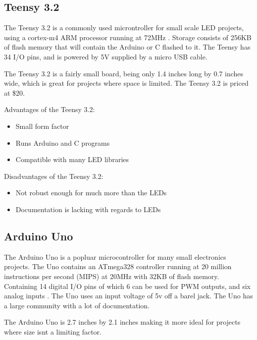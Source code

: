 \documentclass[onecolumn, draftclsnofoot,10pt, compsoc]{IEEEtran}
\begin{document}
		\subsection{Teensy 3.2}
		The Teensy 3.2 is a commonly used microntroller for small scale LED projects,
		using a cortex-m4 ARM processor running at 72MHz \cite[Pg 7]{K20}. Storage consists
		of 256KB of flash memory that will contain the Arduino or C flashed to it.
		The Teensy has 34 I/O pins, and is powered by 5V supplied by a micro USB
		cable.

		\vspace{5mm}
		\noindent The Teensy 3.2 is a fairly small board, being only 1.4 inches long
		by 0.7 inches wide, which is great for projects where space is limited. The
		Teensy 3.2 is priced at \$20.

		\vspace{5mm}
		\noindent Advantages of the Teensy 3.2:
		\begin{itemize}
			\item Small form factor
			\item Runs Arduino and C programs
			\item Compatible with many LED libraries
		\end{itemize}
		Disadvantages of the Teensy 3.2:
		\begin{itemize}
			\item Not robust enough for much more than the LEDs
			\item Documentation is lacking with regards to LEDs
		\end{itemize}
		\subsection{Arduino Uno}

		\vspace{5mm}
		\noindent The Arduino Uno is a popluar microcontroller for many small electronics
		projects. The Uno contains an ATmega328 controller running at 20 million
		instructions per second (MIPS) at 20MHz with 32KB of flash
		memory\cite[Pg 7]{atmel}. Containing 14 digital I/O pins of which 6
		can be used for PWM outputs, and six analog inputs \cite[Pg 7]{arduino}.
		The Uno uses an input voltage of 5v off a barel jack. The Uno has a large community with
		a lot of documentation.

		\vspace{5mm}
		\noindent The Arduino Uno is 2.7 inches by 2.1 inches making it more ideal for
		projects where size isnt a limiting factor.
\end{document}
